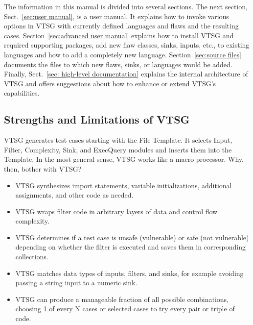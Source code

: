 The information in this manual is divided into several sections.  The next section,
Sect.~\ref{sec:user manual}, is a user manual.  It explains how to invoke various
options in VTSG with currently defined languages and flaws and the resulting cases.
Section~\ref{sec:advanced user manual} explains how to install VTSG and required
supporting packages, add new flaw classes, sinks, inputs, etc., to
existing languages
and how to add a completely new language.
Section~\ref{sec:source files} documents the files to which new flaws, sinks, or
languages would be added.
Finally, Sect.~\ref{sec: high-level documentation} explains the internal architecture
of VTSG
and offers suggestions about how to enhance or extend VTSG's capabilities.

\subsection{Strengths and Limitations of VTSG}

VTSG generates test cases starting with the File Template.  It selects Input,
Filter, Complexity, Sink, and ExecQuery modules and inserts them into the Template.
In the most general sense, VTSG works like a macro processor.  Why, then, bother with
VTSG?
\begin{itemize}
  \item VTSG synthesizes import statements, variable initializations, additional
    assignments, and other code as needed.
  \item VTSG wraps filter code in arbitrary layers of data and control flow
    complexity.
  \item VTSG determines if a test case is unsafe (vulnerable) or safe (not
    vulnerable) depending on whether the filter is executed and saves them in
    corresponding collections.
  \item VTSG matches data types of inputs, filters, and sinks, for example avoiding
    passing a string input to a numeric sink.
  \item VTSG can produce a manageable fraction of all possible combinations, choosing
    1 of every N cases or selected cases to try every pair or triple of code.
\end{itemize}

